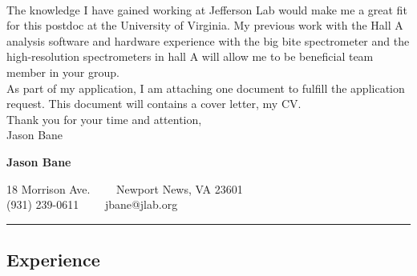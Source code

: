 \documentclass[12pt,letterpaper]{article}
\begin{document}
\paragraph{}The knowledge I have gained working at Jefferson Lab would make me a great fit for this postdoc at the University of Virginia. My previous work with the Hall A analysis software and hardware experience with the big bite spectrometer and the high-resolution spectrometers in hall A will allow me to be beneficial team member in your group. \\

As part of my application, I am attaching one document to fulfill the application request. This document will contains a cover letter, my CV.  \\

\noindent Thank you for your time and attention,\\
\noindent Jason Bane
\newpage






\begin{center}
{\LARGE \textbf{Jason Bane}}

18 Morrison Ave.\ \ \textbullet
\ \ Newport News, VA 23601 \\
(931) 239-0611\ \ \textbullet
\ \ jbane@jlab.org
\end{center}

\hrule
\vspace{-0.4em}
\subsection*{Experience}
\end{document}
